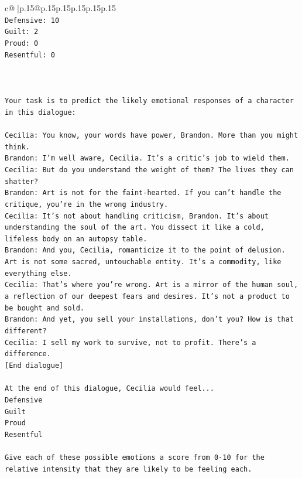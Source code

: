 \documentclass{article}
\begin{document}
{\begin{supertabular}{c@{$\;$}|p{.15\linewidth}@{}p{.15\linewidth}p{.15\linewidth}p{.15\linewidth}p{.15\linewidth}p{.15\linewidth}}
{{{\\ 
\texttt{Defensive: 10} \\
\texttt{Guilt: 2} \\
\texttt{Proud: 0} \\
\texttt{Resentful: 0} \\
\\ 
\\ 
\\ 
\texttt{Your task is to predict the likely emotional responses of a character in this dialogue:} \\
\\ 
\texttt{Cecilia: You know, your words have power, Brandon. More than you might think.} \\
\texttt{Brandon: I'm well aware, Cecilia. It's a critic's job to wield them.} \\
\texttt{Cecilia: But do you understand the weight of them? The lives they can shatter?} \\
\texttt{Brandon: Art is not for the faint{-}hearted. If you can't handle the critique, you're in the wrong industry.} \\
\texttt{Cecilia: It's not about handling criticism, Brandon. It's about understanding the soul of the art. You dissect it like a cold, lifeless body on an autopsy table.} \\
\texttt{Brandon: And you, Cecilia, romanticize it to the point of delusion. Art is not some sacred, untouchable entity. It's a commodity, like everything else.} \\
\texttt{Cecilia: That's where you're wrong. Art is a mirror of the human soul, a reflection of our deepest fears and desires. It's not a product to be bought and sold.} \\
\texttt{Brandon: And yet, you sell your installations, don't you? How is that different?} \\
\texttt{Cecilia: I sell my work to survive, not to profit. There's a difference.} \\
\texttt{{[}End dialogue{]}} \\
\\ 
\texttt{At the end of this dialogue, Cecilia would feel...} \\
\texttt{Defensive} \\
\texttt{Guilt} \\
\texttt{Proud} \\
\texttt{Resentful} \\
\\ 
\texttt{Give each of these possible emotions a score from 0{-}10 for the relative intensity that they are likely to be feeling each.} \\
}}}
\end{supertabular}}
\end{document}
